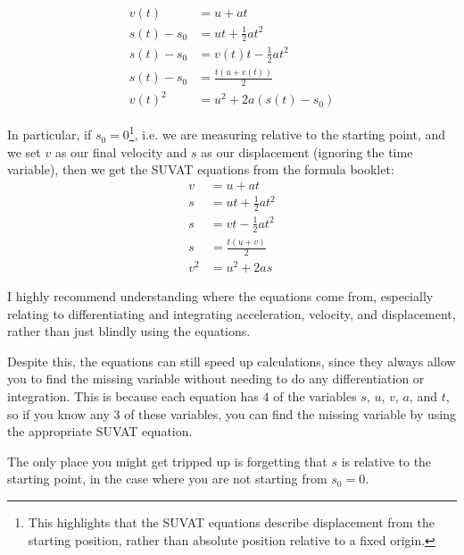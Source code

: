 \begin{align*}
    v(t) &= u + at \\
    s(t) - s_0 &= ut + \frac{1}{2}at^2 \\
    s(t) - s_0 &= v(t)t - \frac{1}{2}at^2 \\
    s(t) - s_0 &= \frac{t(u + v(t))}{2} \\
    v(t)^2&= u^2 + 2a(s(t) - s_0)
\end{align*}

In particular, if $s_0 = 0$\footnote{This highlights that the SUVAT equations describe displacement from the starting position, rather than absolute position relative to a fixed origin.}, i.e. we are measuring relative to the starting point, and we set $v$ as our final velocity and $s$ as our displacement (ignoring the time variable), then we get the SUVAT equations from the formula booklet:
\begin{align*}
    v &= u + at \\
    s &= ut + \frac{1}{2}at^2 \\
    s &= vt - \frac{1}{2}at^2 \\
    s &= \frac{t(u + v)}{2} \\
    v^2&= u^2 + 2as
\end{align*}

I highly recommend understanding where the equations come from, especially relating to differentiating and integrating acceleration, velocity, and displacement, rather than just blindly using the equations.

Despite this, the equations can still speed up calculations, since they always allow you to find the missing variable without needing to do any differentiation or integration. 
This is because each equation has $4$ of the variables $s$, $u$, $v$, $a$, and $t$, so if you know any $3$ of these variables, you can find the missing variable by using the appropriate SUVAT equation.

The only place you might get tripped up is forgetting that $s$ is relative to the starting point, in the case where you are not starting from $s_0 = 0$.

